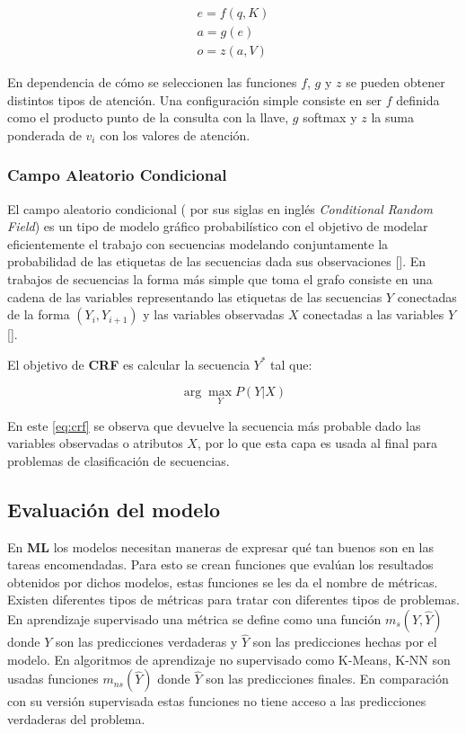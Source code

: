 \begin{equation}
	\begin{align}
		e = f(q, K) \\
		a = g(e) \\ 
		o = z(a, V)
	\end{align}
\end{equation}

En dependencia de cómo se seleccionen las funciones $f$, $g$ y $z$ se pueden obtener distintos tipos de atención.
Una configuración simple consiste en ser $f$ definida como el producto punto de la consulta con la llave,
$g$ softmax y $z$ la suma ponderada de $v_i$ con los valores de atención. 

\subsubsection{Campo Aleatorio Condicional}


El campo aleatorio condicional ( por sus siglas en inglés \emph{Conditional Random Field}) es un 
tipo de modelo gráfico probabilístico con el objetivo de modelar eficientemente el trabajo con secuencias 
modelando conjuntamente la probabilidad de las etiquetas de las secuencias dada sus observaciones [\cite{lafferty2001conditional}].
En trabajos de secuencias la forma más simple que toma el grafo consiste en una cadena de las variables representando
las etiquetas de las secuencias $Y$ conectadas de la forma $(Y_i, Y_{i+1})$ y las variables observadas $X$ conectadas
a las variables $Y$ [\cite{wallach2004conditional}].

El objetivo de \textbf{CRF} es calcular la secuencia $Y^*$ tal que:

\begin{equation}
	\arg \max_Y P(Y | X)
\end{equation}\label{eq:crf}

En este \ref{eq:crf} se observa que devuelve la secuencia más probable dado las variables observadas o atributos $X$,
por lo que esta capa es usada al final para problemas de clasificación de secuencias.

\subsection{Evaluación del modelo}

En \textbf{ML} los modelos necesitan maneras de expresar qué tan buenos son 
en las tareas encomendadas. Para esto se crean funciones que evalúan los resultados obtenidos
por dichos modelos, estas funciones se les da el nombre de métricas. Existen diferentes tipos de
métricas para tratar con diferentes tipos de problemas. En aprendizaje supervisado una métrica se
define como una función $m_s(Y, \hat{Y})$ donde $Y$ son las predicciones verdaderas y $\hat{Y}$ son las predicciones
hechas por el modelo. En algoritmos de aprendizaje no supervisado como K-Means, K-NN son usadas funciones $m_{ns}(\hat{Y})$
donde $\hat{Y}$ son las predicciones finales. En comparación con su versión supervisada estas funciones no tiene acceso
a las predicciones verdaderas del problema.

